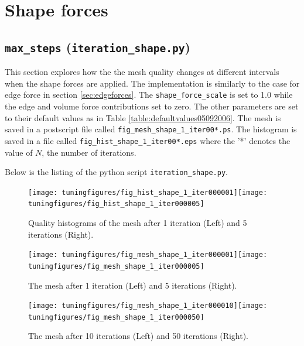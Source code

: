 \documentclass[10pt,a4paper]{book}
\newcommand{\py}[1]{\texttt{\color{blue}#1}}
\begin{document}
\clearpage
\section{Shape forces}
\label{sec:shapeforces}

\subsection{\texttt{max\_steps} (\py{iteration\_shape.py})}
\label{sec:maxstepshape}
This section explores how the the mesh quality changes at different intervals when the shape forces are applied. The implementation is similarly to the
case for edge force in section \ref{sec:edgeforces}. The
\texttt{shape\_force\_scale} is set to 1.0 while the edge and volume force contributions
set to zero. The other parameters are set to their default values as in Table \ref{table:defaultvalues05092006}. The mesh is saved in a postscript file called \texttt{fig\_mesh\_shape\_1\_iter00*.ps}. The histogram is saved in a file called \texttt{fig\_hist\_shape\_1\_iter00*.eps} where the '*' denotes the value of $N$, the number of iterations.

Below is the listing of the python script \py{iteration\_shape.py}.




\begin{figure}[tbhp]
\centerline{\texttt{[image: tuningfigures/fig\_hist\_shape\_1\_iter000001]}\hspace{3cm}\texttt{[image: tuningfigures/fig\_hist\_shape\_1\_iter000005]}}
\caption{\label{fig:fig_hist_shape_1_iter000001} Quality histograms of the mesh after 1 iteration (Left) and 5 iterations (Right).}
\end{figure}

\begin{figure}[tbhp]
\centerline{\texttt{[image: tuningfigures/fig\_mesh\_shape\_1\_iter000001]}\hspace{3cm}\texttt{[image: tuningfigures/fig\_mesh\_shape\_1\_iter000005]}}
\caption{\label{fig:fig_mesh_shape_1_iter000001} The mesh after 1 iteration (Left) and 5 iterations (Right).}
\end{figure}

\begin{figure}[tbhp]
\centerline{\texttt{[image: tuningfigures/fig\_mesh\_shape\_1\_iter000010]}\hspace{3cm}\texttt{[image: tuningfigures/fig\_mesh\_shape\_1\_iter000050]}}
\caption{\label{fig:fig_mesh_shape_1_iter000010} The mesh after 10 iterations (Left) and 50 iterations (Right).}
\end{figure}
\end{document}
